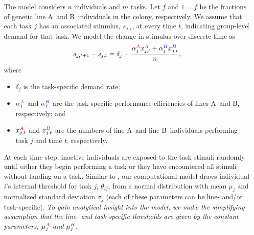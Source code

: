\documentclass[10pt]{article}
\newcommand{\A}{{\color{red}A}}
\newcommand{\B}{{\color{blue}B}}
\begin{document}
The model considers $n$ individuals and $m$ tasks. 
{\color{orange}Let $f$ and $1=f$ be the fractions of genetic line \A\ and \B\ individuals in the colony, respectively.}
We assume that each task $j$ has an associated stimulus, $s_{j,t}$, at every time $t$, indicating group-level demand for that task. We model the change in stimulus over discrete time as
\begin{equation}
    s_{j,t+1} - s_{j,t} = \delta_j - \frac{\alpha_j^{\A} x_{j,t}^{\A} + \alpha_j^{\B} x_{j,t}^{\B} }{n}, \label{eq:stim}
\end{equation}
where 
\begin{itemize}
    \item $\delta_j$ is the task-specific demand rate;
    \item $\alpha_j^{\A}$ and $\alpha_j^{\B}$ are the task-specific performance efficiencies of lines \A\ and \B, respectively; and
    \item $x_{j,t}^{\A}$ and $x_{j,t}^{\B}$ are the numbers of line \A\ and line \B\ individuals performing task $j$ and time $t$, respectively.
\end{itemize}

At each time step, inactive individuals are exposed to the task stimuli randomly until either they begin performing a task or they have encountered all stimuli without landing on a task. Similar to \cite{ulrich18}, our computational model draws individual $i$'s internal threshold for task $j$, $\theta_{ij}$, from a normal distribution with mean $\mu_j$ and normalized standard deviation $\sigma_j$ (each of these parameters can be line- and/or task-specific). \textit{To gain analytical insight into the model, we make the simplifying assumption that the line- and task-specific thresholds are given by the constant parameters, $\mu_j^{\A}$ and $\mu_j^{\B}$.}
\end{document}
